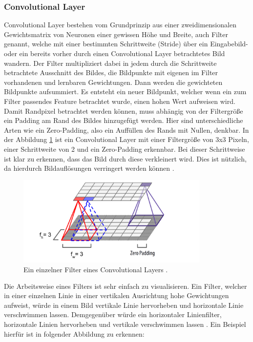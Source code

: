 \documentclass[11pt,bibliography=totocnumbered]{scrartcl}
\begin{document}
\subsubsection{Convolutional Layer}
Convolutional Layer bestehen vom Grundprinzip aus einer zweidimensionalen Gewichtsmatrix von Neuronen einer gewissen Höhe und Breite, auch Filter genannt, welche mit einer bestimmten Schrittweite (Stride) über ein Eingabebild- oder ein bereits vorher durch einen Convolutional Layer betrachtetes Bild wandern. Der Filter multipliziert dabei in jedem durch die Schrittweite betrachtete Ausschnitt des Bildes, die Bildpunkte mit eigenen im Filter vorhandenen und lernbaren Gewichtungen. Dann werden die gewichteten Bildpunkte aufsummiert. Es entsteht ein neuer Bildpunkt, welcher wenn ein zum Filter passendes Feature betrachtet wurde, einen hohen Wert aufweisen wird. Damit Randpixel betrachtet werden können, muss abhängig von der Filtergröße ein Padding am Rand des Bildes hinzugefügt werden. Hier sind unterschiedliche Arten wie ein Zero-Padding, also ein Auffüllen des Rands mit Nullen, denkbar. In der Abbildung \ref{fig:cnn_filter} ist ein Convolutional Layer mit einer Filtergröße von 3x3 Pixeln, einer Schrittweite von 2 und ein Zero-Padding erkennbar. Bei dieser Schrittweise ist klar zu erkennen, dass das Bild durch diese verkleinert wird. Dies ist nützlich, da hierdurch Bildauflösungen verringert werden können \cite[S.361-363]{MACHINE_LEARNING}.
\begin{figure}[H]
	\centering
	\includegraphics[width=0.85\textwidth]{cnn}
	\vspace*{-3mm}
	\caption[Einzelner Filter eines Convolutional Layers]{Ein einzelner Filter eines Convolutional Layers \cite[S.362]{MACHINE_LEARNING}.}
	\label{fig:cnn_filter}
\end{figure}
\vspace*{-5mm}
Die Arbeitsweise eines Filters ist sehr einfach zu visualisieren. Ein Filter, welcher in einer einzelnen Linie in einer vertikalen Ausrichtung hohe Gewichtungen aufweist, würde in einem Bild vertikale Linie hervorheben und horizontale Linie verschwimmen lassen. Demgegenüber würde ein horizontaler Linienfilter, horizontale Linien hervorheben und vertikale verschwimmen lassen \cite[S.363-364]{MACHINE_LEARNING}. Ein Beispiel hierfür ist in folgender Abbildung zu erkennen:
\end{document}
